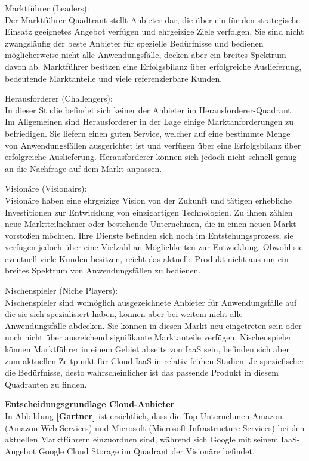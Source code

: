 \documentclass[12pt,a4paper,bibliography=totocnumbered,listof=totocnumbered]{scrartcl}
\newcommand*{\fullref}[1]{\textbf{\hyperref[{#1}]{\ref*{#1} \nameref*{#1}}}}
\begin{document}
\begin{compactitem}
\item{Marktführer (Leaders):}
\\Der Marktführer-Quadtrant stellt Anbieter dar, die über ein für den strategische Einsatz geeignetes Angebot verfügen und ehrgeizige Ziele verfolgen. Sie sind nicht zwangsläufig der beste Anbieter für spezielle Bedürfnisse und bedienen möglicherweise nicht alle Anwendungsfälle, decken aber ein breites Spektrum davon ab. Marktführer besitzen eine Erfolgsbilanz über erfolgreiche Auslieferung, bedeutende Marktanteile und viele referenzierbare Kunden.
\item{Herausforderer (Challengers):}
\\In dieser Studie befindet sich keiner der Anbieter im Herausforderer-Quadrant. Im Allgemeinen sind Herausforderer in der Lage einige Marktanforderungen zu befriedigen. Sie liefern einen guten Service, welcher auf eine bestimmte Menge von Anwendungsfällen ausgerichtet ist und verfügen über eine Erfolgsbilanz über erfolgreiche Auslieferung. Herausforderer können sich jedoch nicht schnell genug an die Nachfrage auf dem Markt anpassen.
\item{Visionäre (Visionairs):}
\\Visionäre haben eine ehrgeizige Vision von der Zukunft und tätigen erhebliche Investitionen zur Entwicklung von einzigartigen Technologien. Zu ihnen zählen neue Marktteilnehmer oder bestehende Unternehmen, die in einen neuen Markt vorstoßen möchten. Ihre Dienste befinden sich noch im Entstehungsprozess, sie verfügen jedoch über eine Vielzahl an Möglichkeiten zur Entwicklung. Obwohl sie eventuell viele Kunden besitzen, reicht das aktuelle Produkt nicht aus um ein breites Spektrum von Anwendungsfällen zu bedienen.
\item{Nischenspieler (Niche Players):}
\\Nischenspieler sind womöglich ausgezeichnete Anbieter für Anwendungsfälle auf die sie sich spezialisiert haben, können aber bei weitem nicht alle Anwendungsfälle abdecken. Sie können in diesen Markt neu eingetreten sein oder noch nicht über ausreichend signifikante Marktanteile verfügen. Nischenspieler können Marktführer in einem Gebiet abseits von IaaS sein, befinden sich aber zum aktuellen Zeitpunkt für Cloud-IaaS in relativ frühen Stadien. Je speziefischer die Bedürfnisse, desto wahrscheinlicher ist das passende Produkt in diesem Quadranten zu finden.
\end{compactitem}

\textbf{Entscheidungsgrundlage Cloud-Anbieter}\\
In Abbildung \fullref{Gartner} ist ersichtlich, dass die Top-Unternehmen Amazon (Amazon Web Services) und Microsoft (Microsoft Infrastructure Services) bei den aktuellen Marktführern einzuordnen sind, während sich Google mit seinem IaaS-Angebot Google Cloud Storage im Quadrant der Visionäre befindet.
\end{document}
